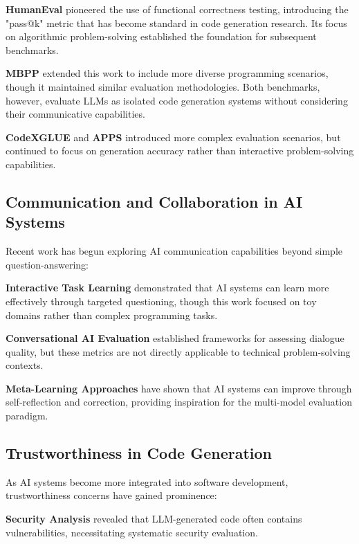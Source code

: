 \documentclass[conference]{IEEEtran}
\begin{document}
\textbf{HumanEval} \cite{chen2021evaluating} pioneered the use of functional correctness testing, introducing the "pass@k" metric that has become standard in code generation research. Its focus on algorithmic problem-solving established the foundation for subsequent benchmarks.

\textbf{MBPP} \cite{austin2021program} extended this work to include more diverse programming scenarios, though it maintained similar evaluation methodologies. Both benchmarks, however, evaluate LLMs as isolated code generation systems without considering their communicative capabilities.

\textbf{CodeXGLUE} \cite{lu2021codexglue} and \textbf{APPS} \cite{hendrycks2021measuring} introduced more complex evaluation scenarios, but continued to focus on generation accuracy rather than interactive problem-solving capabilities.

\subsection{Communication and Collaboration in AI Systems}

Recent work has begun exploring AI communication capabilities beyond simple question-answering:

\textbf{Interactive Task Learning} \cite{wang2021towards} demonstrated that AI systems can learn more effectively through targeted questioning, though this work focused on toy domains rather than complex programming tasks.

\textbf{Conversational AI Evaluation} \cite{adiwardana2020towards} established frameworks for assessing dialogue quality, but these metrics are not directly applicable to technical problem-solving contexts.

\textbf{Meta-Learning Approaches} \cite{finn2017model} have shown that AI systems can improve through self-reflection and correction, providing inspiration for the multi-model evaluation paradigm.

\subsection{Trustworthiness in Code Generation}

As AI systems become more integrated into software development, trustworthiness concerns have gained prominence:

\textbf{Security Analysis} \cite{pearce2022asleep} revealed that LLM-generated code often contains vulnerabilities, necessitating systematic security evaluation.
\end{document}
